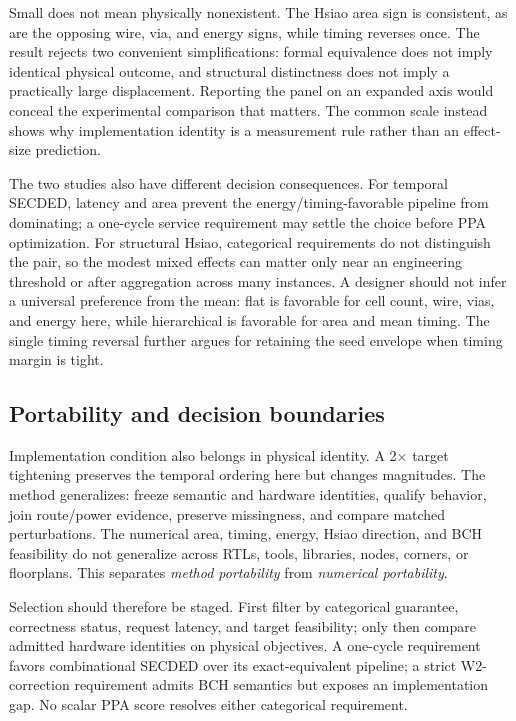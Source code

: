 \documentclass[conference,10pt]{IEEEtran}
\begin{document}
Small does not mean physically nonexistent. The Hsiao area sign is consistent, as are the opposing wire, via, and energy signs, while timing reverses once. The result rejects two convenient simplifications: formal equivalence does not imply identical physical outcome, and structural distinctness does not imply a practically large displacement. Reporting the panel on an expanded axis would conceal the experimental comparison that matters. The common scale instead shows why implementation identity is a measurement rule rather than an effect-size prediction.

The two studies also have different decision consequences. For temporal SECDED, latency and area prevent the energy/timing-favorable pipeline from dominating; a one-cycle service requirement may settle the choice before PPA optimization. For structural Hsiao, categorical requirements do not distinguish the pair, so the modest mixed effects can matter only near an engineering threshold or after aggregation across many instances. A designer should not infer a universal preference from the mean: flat is favorable for cell count, wire, vias, and energy here, while hierarchical is favorable for area and mean timing. The single timing reversal further argues for retaining the seed envelope when timing margin is tight.

\subsection{Portability and decision boundaries}

Implementation condition also belongs in physical identity. A 2$\times$ target tightening preserves the temporal ordering here but changes magnitudes. The method generalizes: freeze semantic and hardware identities, qualify behavior, join route/power evidence, preserve missingness, and compare matched perturbations. The numerical area, timing, energy, Hsiao direction, and BCH feasibility do not generalize across RTLs, tools, libraries, nodes, corners, or floorplans. This separates \emph{method portability} from \emph{numerical portability}.

Selection should therefore be staged. First filter by categorical guarantee, correctness status, request latency, and target feasibility; only then compare admitted hardware identities on physical objectives. A one-cycle requirement favors combinational SECDED over its exact-equivalent pipeline; a strict W2-correction requirement admits BCH semantics but exposes an implementation gap. No scalar PPA score resolves either categorical requirement.
\end{document}
